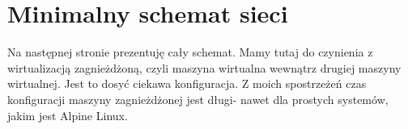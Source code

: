 \documentclass[a4paper,11pt]{article}
\begin{document}
\section{Minimalny schemat sieci}

Na następnej stronie prezentuję cały schemat. Mamy tutaj do czynienia z wirtualizacją
zagnieżdżoną, czyli maszyna wirtualna wewnątrz drugiej maszyny wirtualnej. Jest to dosyć ciekawa konfiguracja. Z moich spostrzeżeń czas konfiguracji maszyny zagnieżdżonej jest długi- nawet dla prostych systemów, jakim jest Alpine Linux.

\pagebreak

\end{document}
